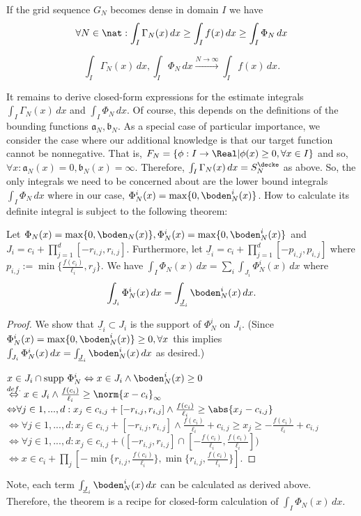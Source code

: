\begin{thm}\label{thm:defintconv_multidim_trunkated}
If the grid sequence $G_N$ becomes dense in domain $I$ we have 
\[\forall N \in \nat : \int_I \Gamma_N(x) \, d x \geq \int_I f(x) \, d x \geq  \int_I  \Phi_N \, d x \]

\[ \int_I \Gamma_N(x) \, d x,  \int_I  \Phi_N \, d x  \stackrel{N \to \infty}{\longrightarrow} \int_I f(x) \, d x.  \]
\end{thm} 

It remains to derive closed-form expressions for the estimate integrals $\int_I \Gamma_N(x) \, d x$ and  $\int_I  \Phi_N \, d x $. Of course, this depends on the definitions of the bounding functions $\mathfrak a_N , \mathfrak b_N$. As a special case of particular importance, we consider the case where our additional knowledge is that our target function cannot be nonnegative. That is, $F_N =\{ \phi: I \to \Real | \phi(x) \geq 0, \forall x \in I\}$ and so, $\forall x: \mathfrak a_N(x) = 0, \mathfrak b_N(x) = \infty$. Therefore, $\int_I \Gamma_N(x) \, d x = S^\decke_N$ as above. So, the only integrals we need to be concerned about are the lower bound integrals $\int_I  \Phi_N \, d x$ where in our case, $\Phi_N^i (x) = \max\{0,\boden^i_N(x)\}$.
How to calculate its definite integral is subject to the following theorem:

\begin{thm}
Let $\Phi_N (x) = \max\{0,\boden_N(x)\}, \Phi^i_N (x) = \max\{0,\boden^i_N(x)\}$ and $J_i = c_i +\prod_{j=1}^d [-r_{i,j},r_{i,j}]$. 
Furthermore, let $\underline J_i = c_i + \prod_{j=1}^d [-p_{i,j},p_{i,j}] $ 
where $p_{i,j} := \min\{\frac{f(c_i)}{\ell_i},r_j \}$.
We have $\int_I \Phi_N(x) \, dx = \sum_i\int_{J_i} \Phi^i_N(x) \, dx$ where 
\[\int_{J_i} \Phi^i_N(x) \, dx = \int_{\underline J_i} \boden^i_N(x) \, dx.  \]
\begin{proof}
We show that $\underline J_i \subset J_i$ is the support of $\Phi^i_N$ on $J_i$. (Since $\Phi^i_N(x) = \max\{ 0, \boden^i_N(x) \} \geq 0, \forall x$ this implies 
$\int_{J_i} \Phi^i_N(x) \, dx = \int_{\underline J_i} \boden^i_N(x) \, dx$ as desired.)

$x \in J_i \cap \text{supp } \Phi^i_N \Leftrightarrow x \in J_i \wedge \boden^i_N(x) \geq 0$ 
$\stackrel{def.}{\Leftrightarrow} x \in J_i \wedge \frac{f(c_i)}{\ell_i} \geq \norm{x-c_i}_\infty$ 
${\Leftrightarrow} \forall j \in {1,...,d}: x_j    \in c_{i,j} + [-r_{i,j},r_{i,j}] \wedge \frac{f(c_i)}{\ell_i} \geq \abs{x_j-c_{i,j}}$
${\Leftrightarrow} \forall j \in {1,...,d}: x_j    \in c_{i,j} + [-r_{i,j},r_{i,j}] \wedge \frac{f(c_i)}{\ell_i} + c_{i,j}  \geq x_j \geq -\frac{f(c_i)}{\ell_i} + c_{i,j}$
${\Leftrightarrow} \forall j \in {1,...,d}: x_j    \in c_{i,j} + \bigl([-r_{i,j},r_{i,j}]\cap [-\frac{f(c_i)}{\ell_i}, \frac{f(c_i)}{\ell_i}] \bigr)$
%
$\Leftrightarrow x    \in c_{i} + \prod_j [-\min\{r_{i,j}, \frac{f(c_i)}{\ell_i}\} , \min\{r_{i,j}, \frac{f(c_i)}{\ell_i}\}]$.

\end{proof}
\end{thm}
Note, each term $\int_{\underline J_i} \boden^i_N(x) \, dx$ can be calculated as derived above. Therefore, the theorem is a recipe for closed-form calculation of $\int_I \Phi_N(x) \, dx$.